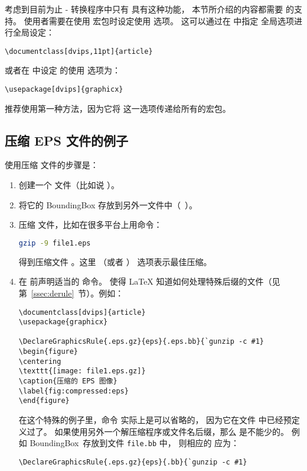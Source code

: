考虑到目前为止 - 转换程序中只有  具有这种功能，
本节所介绍的内容都需要  的支持。
使用者需要在使用  宏包时设定使用  选项。
这可以通过在  中指定  全局选项进行全局设定：
\begin{lstlisting}
\documentclass[dvips,11pt]{article}
\end{lstlisting}
或者在  中设定  的使用  选项为：
\begin{lstlisting}
\usepackage[dvips]{graphicx}
\end{lstlisting}
推荐使用第一种方法，因为它将  这一选项传递给所有的宏包。


\subsection{压缩 EPS 文件的例子}\label{ssec:compresseps}

使用压缩  文件的步骤是：
\begin{enumerate}
	\item 创建一个  文件（比如说 ）。
	\item 将它的 BoundingBox 存放到另外一文件中（~）。
	\item 压缩    文件，比如在很多平台上用命令：
	\begin{lstlisting}[language=bash]
	gzip -9 file1.eps
	\end{lstlisting}
	得到压缩文件 。这里 （或者 ） 选项表示最佳压缩。
	\item 在 前声明适当的  命令。
	使得 \LaTeX{} 知道如何处理特殊后缀的文件（见第~\ref{ssec:derule}~节）。例如：
\begin{lstlisting}
\documentclass[dvips]{article}
\usepackage{graphicx}

\DeclareGraphicsRule{.eps.gz}{eps}{.eps.bb}{`gunzip -c #1}
\begin{figure}
\centering
\texttt{[image: file1.eps.gz]}
\caption{压缩的 EPS 图像}
\label{fig:compressed:eps}
\end{figure}

\end{lstlisting}
	在这个特殊的例子里，命令  实际上是可以省略的，
	因为它在文件  中已经预定义过了。
	如果使用另外一个解压缩程序或文件名后缀，那么  是不能少的。
	例如 BoundingBox~存放到文件 \texttt{file.bb} 中，
	则相应的  应为：
\begin{lstlisting}
\DeclareGraphicsRule{.eps.gz}{eps}{.bb}{`gunzip -c #1}
\end{lstlisting}
\end{enumerate}


